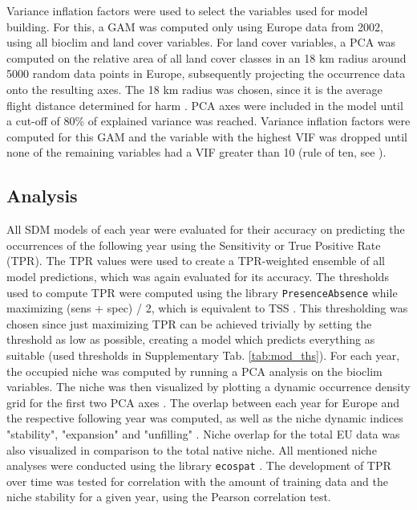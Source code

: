 \documentclass[12pt,a4paper]{article}
\begin{document}
Variance inflation factors were used to select the variables used for model building.
For this, a GAM was computed only using Europe data from 2002, using all bioclim and land cover variables.
For land cover variables, a PCA was computed on the relative area of all land cover classes in an 18 km radius around 5000 random data points in Europe, subsequently projecting the occurrence data onto the resulting axes.
The 18 km radius was chosen, since it is the average flight distance determined for \gls{harm} \autocite{jeffries2013flightharmonia}.
PCA axes were included in the model until a cut-off of 80\% of explained variance was reached.
Variance inflation factors were computed for this GAM and the variable with the highest VIF was dropped until none of the remaining variables had a VIF greater than 10 (rule of ten, see \autocite{obrien2007cautionVIFs}).

\subsection{Analysis} \label{ssec:analysis}
All SDM models of each year were evaluated for their accuracy on predicting the occurrences of the following year using the Sensitivity or True Positive Rate (TPR).
The TPR values were used to create a TPR-weighted ensemble of all model predictions, which was again evaluated for its accuracy.
The thresholds used to compute TPR were computed using the library \texttt{PresenceAbsence} \autocite{freeman2008presenceabsence} while maximizing (sens + spec) / 2, which is equivalent to TSS \autocite{allouche2006TSS}.
This thresholding was chosen since just maximizing TPR can be achieved trivially by setting the threshold as low as possible, creating a model which predicts everything as suitable (used thresholds in Supplementary Tab. \ref{tab:mod_ths}).
For each year, the occupied niche was computed by running a PCA analysis on the bioclim variables.
The niche was then visualized by plotting a dynamic occurrence density grid for the first two PCA axes \autocite{broennimann2012niche}.
The overlap between each year for Europe and the respective following year was computed, as well as the niche dynamic indices "stability", "expansion" and "unfilling" \autocite{guisan2014nichedyn}.
Niche overlap for the total EU data was also visualized in comparison to the total native niche.
All mentioned niche analyses were conducted using the library \texttt{ecospat} \autocite{dicola2017ecospat}.
The development of TPR over time was tested for correlation with the amount of training data and the niche stability for a given year, using the Pearson correlation test.
\end{document}
